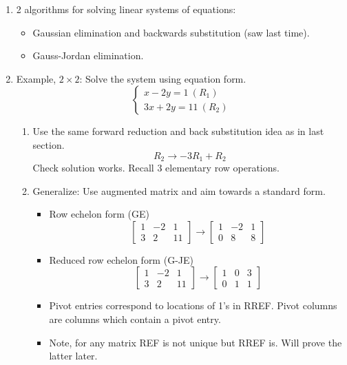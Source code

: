 \documentclass{article}
\begin{document}
\begin{enumerate}

\item 2 algorithms for solving linear systems of equations: 
\begin{itemize}
\item Gaussian elimination and backwards substitution (saw last time).
\item Gauss-Jordan elimination.
\end{itemize}

\item Example, $2 \times 2$: Solve the system using equation form.
\[
\begin{cases}
x - 2y = 1 ~(R_1) \\
3x + 2y = 11 ~ (R_2)
\end{cases}
\]

\begin{enumerate}
\item Use the same forward reduction and back substitution idea as in last section.
\[
R_2 \rightarrow -3R_1 + R_2
\]
Check solution works. Recall 3 elementary row operations.

\item Generalize: Use augmented matrix and aim towards a standard form.
\begin{itemize}
\item Row echelon form (GE)
\[
\left[
\begin{array} {cc|c}
1 & -2 & 1 \\
3 & 2 & 11
\end{array}
\right]
\rightarrow
\left[
\begin{array} {cc|c}
1 & -2 & 1 \\
0 & 8 & 8
\end{array}
\right]
\]
\item Reduced row echelon form (G-JE)
\[
\left[
\begin{array} {cc|c}
1 & -2 & 1 \\
3 & 2 & 11
\end{array}
\right]
\rightarrow
\left[
\begin{array} {cc|c}
1 & 0 & 3 \\
0 & 1 & 1
\end{array}
\right]
\]
\item Pivot entries correspond to locations of 1's in RREF. Pivot columns are columns which contain a pivot entry.
\item Note, for any matrix REF is not unique but RREF is. Will prove the latter later.
\end{itemize}


\end{enumerate}
\end{enumerate}
\end{document}
